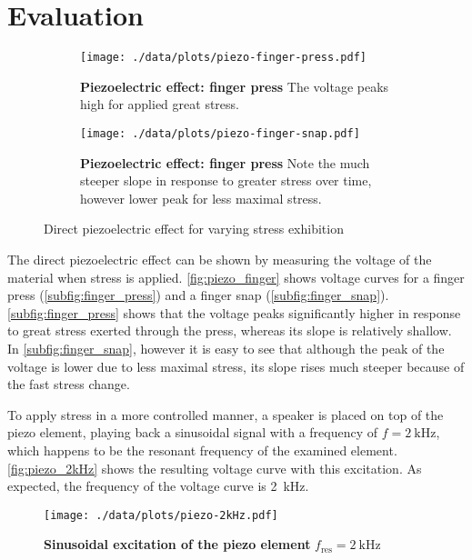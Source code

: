 \section{Evaluation}
\begin{figure}[tbp]
	\centering
	\begin{subfigure}{0.4\textwidth}
		\centering
		\texttt{[image: ./data/plots/piezo-finger-press.pdf]}
		\caption[Piezoelectric effect: finger press]{\textbf{Piezoelectric effect: finger press} The voltage peaks high for applied great stress.}
		\label{subfig:finger_press}
	\end{subfigure}\quad
	\begin{subfigure}{0.4\textwidth}
		\centering
		\texttt{[image: ./data/plots/piezo-finger-snap.pdf]}
		\caption[Piezoelectric effect: finger snap]{\textbf{Piezoelectric effect: finger press} Note the much steeper slope in response to greater stress over time, however lower peak for less maximal stress.}
		\label{subfig:finger_snap}
	\end{subfigure}
	\caption{Direct piezoelectric effect for varying stress exhibition}
	\label{fig:piezo_finger}
\end{figure}
The direct piezoelectric effect can be shown by measuring the voltage of the material when stress is applied.
\autoref{fig:piezo_finger} shows voltage curves for a finger press (\autoref{subfig:finger_press}) and a finger snap (\autoref{subfig:finger_snap}).
\autoref{subfig:finger_press} shows that the voltage peaks significantly higher in response to great stress exerted through the press, whereas its slope is relatively shallow.
In \autoref{subfig:finger_snap}, however it is easy to see that although the peak of the voltage is lower due to less maximal stress, its slope rises much steeper because of the fast stress change.

To apply stress in a more controlled manner, a speaker is placed on top of the piezo element, playing back a sinusoidal signal with a frequency of $f=\SI{2}{\kilo\hertz}$, which happens to be the resonant frequency of the examined element.
\autoref{fig:piezo_2kHz} shows the resulting voltage curve with this excitation.
As expected, the frequency of the voltage curve is \SI{2}{\kilo\hertz}.
\begin{figure}[tbp]
	\centering
	\texttt{[image: ./data/plots/piezo-2kHz.pdf]}
	\caption[Sinusoidal excitation of the piezo element]{\textbf{Sinusoidal excitation of the piezo element} $f_\text{res}=\SI{2}{\kilo\hertz}$}
	\label{fig:piezo_2kHz}
\end{figure}
